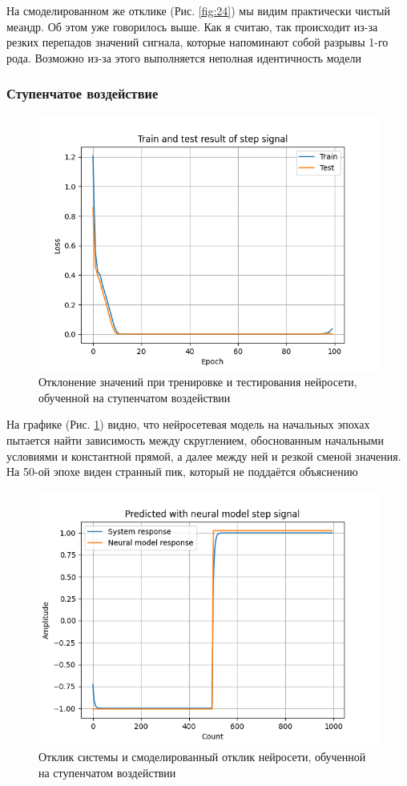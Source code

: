 На смоделированном же отклике (Рис. \ref{fig:24}) мы видим практически чистый меандр.
Об этом уже говорилось выше. Как я считаю, так происходит из-за резких перепадов значений сигнала, которые напоминают собой
разрывы 1-го рода. Возможно из-за этого выполняется неполная идентичность модели

\subsubsection{Ступенчатое воздействие}

\begin{figure}[H]
	\centering
	\includegraphics[width=0.7\linewidth]{body/images/Train-and-test-result-of-step-signal.png}
	\caption{Отклонение значений при тренировке и тестирования нейросети, обученной на ступенчатом воздействии}
	\label{fig:25}
\end{figure}

На графике (Рис. \ref{fig:25}) видно, что нейросетевая модель на начальных эпохах пытается найти зависимость между скруглением, обоснованным
начальными условиями и константной прямой, а далее между ней и резкой сменой значения. На 50-ой эпохе виден странный пик, который не поддаётся объяснению 

\begin{figure}[H]
	\centering
	\includegraphics[width=0.7\linewidth]{body/images/Predicted-with-neural-model-step-signal.png}
	\caption{Отклик системы и смоделированный отклик нейросети, обученной на ступенчатом воздействии}
	\label{fig:26}
\end{figure}


